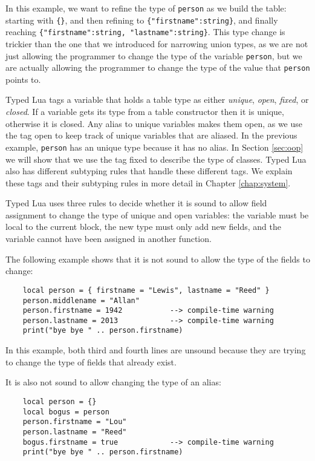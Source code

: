 In this example, we want to refine the type of \texttt{person} as
we build the table:
starting with \texttt{\{\}}, and then refining to \texttt{\{"firstname":string\}},
and finally reaching \texttt{\{"firstname":string, "lastname":string\}}.
This type change is trickier than the one that we introduced for narrowing
union types, as we are not just allowing the programmer to change
the type of the variable \texttt{person}, but we are actually allowing
the programmer to change the type of the value that \texttt{person} points to.

Typed Lua tags a variable that holds a table type as either
\emph{unique}, \emph{open}, \emph{fixed}, or \emph{closed}.
If a variable gets its type from a table constructor then it is
unique, otherwise it is closed.
Any alias to unique variables makes them open, as we use the
tag open to keep track of unique variables that are aliased.
In the previous example, \texttt{person} has an unique type
because it has no alias.
In Section \ref{sec:oop} we will show that we use the tag
fixed to describe the type of classes.
Typed Lua also has different subtyping rules that handle these
different tags.
We explain these tags and their subtyping rules in more detail
in Chapter \ref{chap:system}.

Typed Lua uses three rules to decide whether it is sound to
allow field assignment to change the type of unique and open
variables:
the variable must be local to the current block,
the new type must only add new fields, and
the variable cannot have been assigned in another function.

The following example shows that it is not sound to allow the
type of the fields to change:
\begin{verbatim}
    local person = { firstname = "Lewis", lastname = "Reed" }
    person.middlename = "Allan"
    person.firstname = 1942           --> compile-time warning
    person.lastname = 2013            --> compile-time warning
    print("bye bye " .. person.firstname)
\end{verbatim}

In this example, both third and fourth lines are unsound because
they are trying to change the type of fields that already exist.

It is also not sound to allow changing the type of an alias:
\begin{verbatim}
    local person = {}
    local bogus = person
    person.firstname = "Lou"
    person.lastname = "Reed"
    bogus.firstname = true            --> compile-time warning
    print("bye bye " .. person.firstname)
\end{verbatim}

